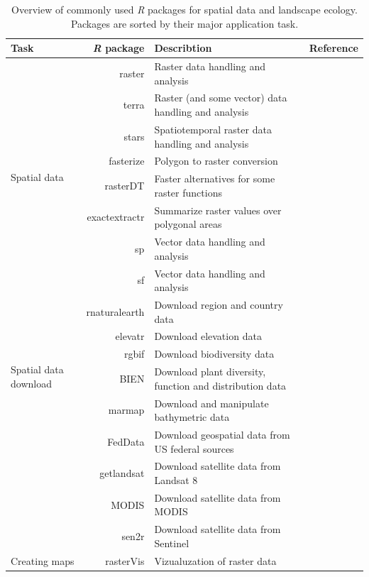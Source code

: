 \documentclass[smallextended]{svjour3}       %
\begin{document}
\begin{table}

\caption{Overview of commonly used \textit{R} packages for spatial data and landscape ecology. Packages are sorted by their major application task.}

\begin{tabularx}{1.35\linewidth}{lrXr}

\hline
Task & \textit{R} package & Describtion & Reference \\
\hline
\multirow{8}{*}{Spatial data} & raster & Raster data handling and analysis & \cite{Hijmans2019} \\
& terra & Raster (and some vector) data handling and analysis & \cite{Hijmans2021} \\
& stars & Spatiotemporal raster data handling and analysis & \cite{Pebesma2019} \\
& fasterize & Polygon to raster conversion & \cite{Ross2020} \\
& rasterDT & Faster alternatives for some raster functions & \cite{OBrien2020} \\
& exactextractr & Summarize raster values over polygonal areas & \cite{Baston2020} \\
& sp & Vector data handling and analysis & \cite{Pebesma2005,Bivand2013} \\
& sf & Vector data handling and analysis & \cite{Pebesma2018} \\
\hline
\multirow{6}{*}{Spatial data download} & rnaturalearth & Download region and country data & \cite{South2017} \\
& elevatr & Download elevation data & \cite{Hollister2020} \\
& rgbif & Download biodiversity data & \cite{Chamberlain2017} \\
& BIEN & Download plant diversity, function and distribution data & \cite{Maitner2020} \\
& marmap & Download and manipulate bathymetric data & \cite{Pante2013} \\
& FedData & Download geospatial data from US federal sources & \cite{Bocinsky2019} \\
& getlandsat & Download satellite data from Landsat 8 & \cite{Chamberlain2018} \\
& MODIS & Download satellite data from MODIS & \cite{Mattiuzzi2020} \\
& sen2r & Download satellite data from Sentinel & \cite{Ranghetti2020} \\
\hline
\multirow{7}{*}{Creating maps} & rasterVis & Vizualuzation of raster data & \cite{Lamigueiro2020} \\

\end{tabularx}
\end{table}
\end{document}
